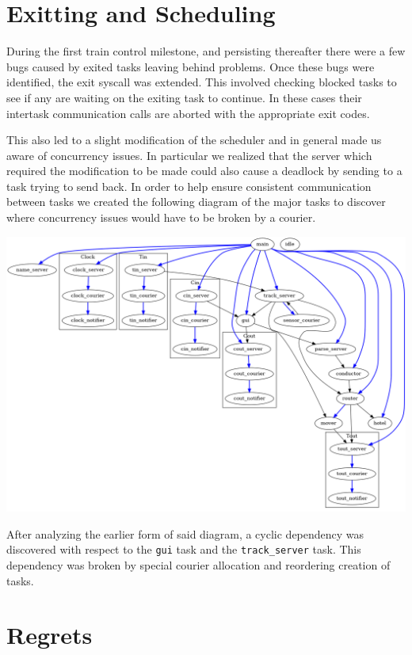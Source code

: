 \documentclass{amsart} \usepackage{amsmath} \usepackage{upgreek}
\newcommand{\x}[1]{\texttt{#1}}
\begin{document}
\section*{Exitting and Scheduling}

During the first train control milestone, and persisting thereafter there were a
few bugs caused by exited tasks leaving behind problems. Once these bugs were
identified, the exit syscall was extended. This involved checking blocked tasks
to see if any are waiting on the exiting task to continue. In these cases their
intertask communication calls are aborted with the appropriate exit codes.

This also led to a slight modification of the scheduler and in general made us
aware of concurrency issues. In particular we realized that the server which
required the modification to be made could also cause a deadlock by sending to a
task trying to send back. In order to help ensure consistent communication
between tasks we created the following diagram of the major tasks to discover
where concurrency issues would have to be broken by a courier.

\includegraphics[width=\textwidth]{../src/tasks.png}

After analyzing the earlier form of said diagram, a cyclic dependency was
discovered with respect to the \x{gui} task and the \x{track\_server} task. This
dependency was broken by special courier allocation and reordering creation of
tasks.

\section*{Regrets}
\end{document}
